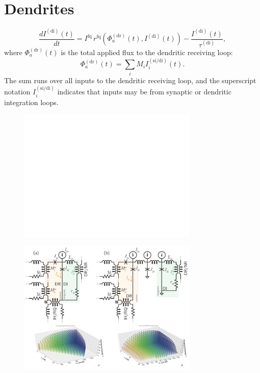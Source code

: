 \documentclass[twocolumn]{article}
\begin{document}
\section{\label{sec:dendrites}Dendrites}

\begin{equation}
\label{eq:dendrites__leaky_integrator}
\frac{dI^{(\mathrm{di})}(t)}{dt} = I^{\mathrm{fq}}\,r^{\mathrm{fq}} \left( \Phi^{(\mathrm{dr})}_a(t),I^{(\mathrm{di})}(t) \right) - \frac{I^{(\mathrm{di})}(t)}{\tau^{(\mathrm{di})}},
\end{equation}
where $\Phi^{(\mathrm{dr})}_a(t)$ is the total applied flux to the dendritic receiving loop:
\begin{equation}
\label{eq:dendrites__applied_flux}
\Phi^{(\mathrm{dr})}_a(t) = \sum_i M_i I_i^{(\mathrm{si/di})}(t).
\end{equation}
The sum runs over all inputs to the dendritic receiving loop, and the superscript notation $I_i^{(\mathrm{si/di})}$ indicates that inputs may be from synaptic or dendritic integration loops.

\begin{figure}[h!]
\includegraphics[width=8.6cm]{figures/_fig__dendrites__circuits_responses.pdf}
\end{figure}

\begin{figure}[h!]
\includegraphics[width=8.6cm]{figures/_fig__dendrites__comparison.pdf}
\end{figure}
\end{document}
